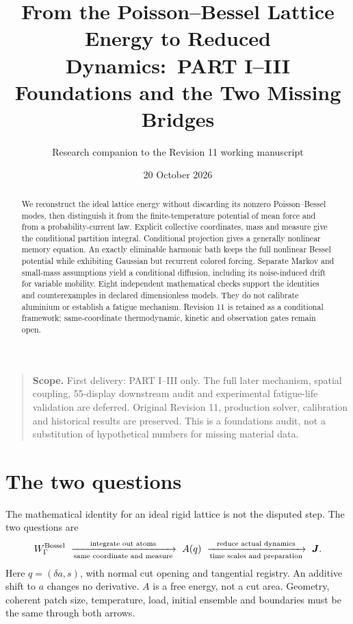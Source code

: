 \documentclass[11pt]{article}
\title{From the Poisson--Bessel Lattice Energy to Reduced Dynamics:\
PART I--III Foundations and the Two Missing Bridges}
\author{Research companion to the Revision 11 working manuscript}
\date{20 October 2026}
\begin{document}
\maketitle
\begin{abstract}
We reconstruct the ideal lattice energy without discarding its nonzero
Poisson--Bessel modes, then distinguish it from the finite-temperature
potential of mean force and from a probability-current law. Explicit
collective coordinates, mass and measure give the conditional partition
integral. Conditional projection gives a generally nonlinear memory
equation. An exactly eliminable harmonic bath keeps the full nonlinear
Bessel potential while exhibiting Gaussian but recurrent colored forcing.
Separate Markov and small-mass assumptions yield a conditional diffusion,
including its noise-induced drift for variable mobility. Eight independent
mathematical checks support the identities and counterexamples in declared
dimensionless models. They do not calibrate aluminium or establish a
fatigue mechanism. Revision 11 is retained as a conditional framework;
same-coordinate thermodynamic, kinetic and observation gates remain open.
\end{abstract}
\begin{quote}\small
\textbf{Scope.} First delivery: PART I--III only. The full later mechanism,
spatial coupling, 55-display downstream audit and experimental fatigue-life
validation are deferred. Original Revision 11, production solver,
calibration and historical results are preserved. This is a foundations
audit, not a substitution of hypothetical numbers for missing material data.
\end{quote}
\tableofcontents

\section{The two questions}
The mathematical identity for an ideal rigid lattice is not the disputed
step. The two questions are
\begin{equation}
W_\Gamma^{\rm Bessel}\ \xrightarrow[\text{same coordinate and measure}]
 {\text{integrate out atoms}}\ A(q)
\ \xrightarrow[\text{time scales and preparation}]
 {\text{reduce actual dynamics}}\ \boldsymbol J.
\end{equation}
Here $q=(\delta a,s)$, with normal cut opening and tangential registry.
An additive shift to $a$ changes no derivative. $A$ is a free energy,
not a cut area. Geometry, coherent patch size, temperature, load, initial
ensemble and boundaries must be the same through both arrows.
\end{document}
